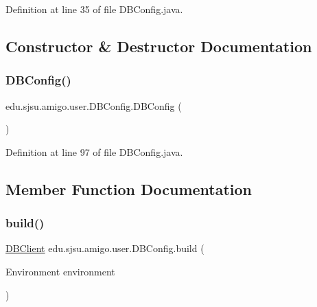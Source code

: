 Definition at line 35 of file D\+B\+Config.\+java.



\subsection{Constructor \& Destructor Documentation}
\mbox{\label{classedu_1_1sjsu_1_1amigo_1_1user_1_1_d_b_config_a7642e94051547c105d59c60d50b97921}} 
\subsubsection{\texorpdfstring{D\+B\+Config()}{DBConfig()}}
{\footnotesize\ttfamily edu.\+sjsu.\+amigo.\+user.\+D\+B\+Config.\+D\+B\+Config (\begin{DoxyParamCaption}{ }\end{DoxyParamCaption})}



Definition at line 97 of file D\+B\+Config.\+java.



\subsection{Member Function Documentation}
\mbox{\label{classedu_1_1sjsu_1_1amigo_1_1user_1_1_d_b_config_a857ab00cb23cfa601bba3ed32803c663}} 
\subsubsection{\texorpdfstring{build()}{build()}}
{\footnotesize\ttfamily \hyperlink{interfaceedu_1_1sjsu_1_1amigo_1_1db_1_1common_1_1_d_b_client}{D\+B\+Client} edu.\+sjsu.\+amigo.\+user.\+D\+B\+Config.\+build (\begin{DoxyParamCaption}\item[{Environment}]{environment }\end{DoxyParamCaption})}



